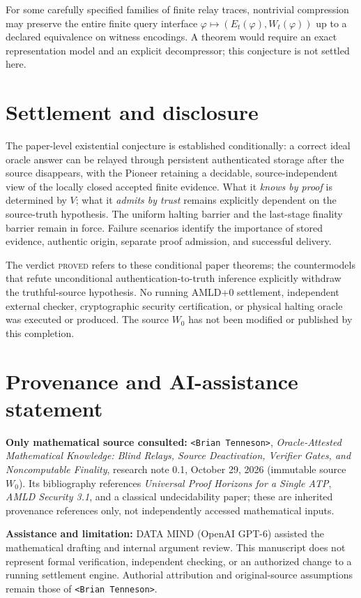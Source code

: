 \documentclass[11pt,letterpaper]{article}
\begin{document}
\begin{conjecture}
For some carefully specified families of finite relay traces, nontrivial compression may preserve the entire finite query interface $\varphi\mapsto(E_t(\varphi),W_t(\varphi))$ up to a declared equivalence on witness encodings. A theorem would require an exact representation model and an explicit decompressor; this conjecture is not settled here.
\end{conjecture}

\section{Settlement and disclosure}
The paper-level existential conjecture is established conditionally: a correct ideal oracle answer can be relayed through persistent authenticated storage after the source disappears, with the Pioneer retaining a decidable, source-independent view of the locally closed accepted finite evidence. What it \emph{knows by proof} is determined by $V$; what it \emph{admits by trust} remains explicitly dependent on the source-truth hypothesis. The uniform halting barrier and the last-stage finality barrier remain in force. Failure scenarios identify the importance of stored evidence, authentic origin, separate proof admission, and successful delivery.

The verdict \textsc{proved} refers to these conditional paper theorems; the countermodels that refute unconditional authentication-to-truth inference explicitly withdraw the truthful-source hypothesis. No running AMLD+0 settlement, independent external checker, cryptographic security certification, or physical halting oracle was executed or produced. The source $W_0$ has not been modified or published by this completion.

\section*{Provenance and AI-assistance statement}
\noindent\textbf{Only mathematical source consulted:} \texttt{<Brian Tenneson>}, \emph{Oracle-Attested Mathematical Knowledge: Blind Relays, Source Deactivation, Verifier Gates, and Noncomputable Finality}, research note 0.1, October 29, 2026 (immutable source $W_0$). Its bibliography references \emph{Universal Proof Horizons for a Single ATP}, \emph{AMLD Security 3.1}, and a classical undecidability paper; these are inherited provenance references only, not independently accessed mathematical inputs.

\medskip\noindent\textbf{Assistance and limitation:} DATA MIND (OpenAI GPT-6) assisted the mathematical drafting and internal argument review. This manuscript does not represent formal verification, independent checking, or an authorized change to a running settlement engine. Authorial attribution and original-source assumptions remain those of \texttt{<Brian Tenneson>}.
\end{document}
